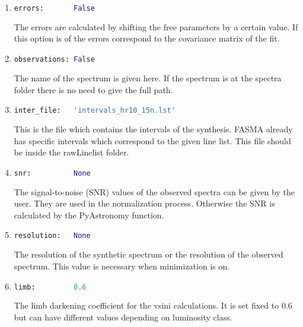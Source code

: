 \documentclass[a4paper,10pt]{article}
\begin{document}
\begin{enumerate}
\item
\begin{lstlisting}[language=Python]
errors:       False
\end{lstlisting}
The errors are calculated by shifting the free parameters by a certain value. If this option is of the errors correspond to the covariance matrix of the fit.

\item
\begin{lstlisting}[language=Python]
observations: False
\end{lstlisting}
The name of the spectrum is given here. If the spectrum is at the spectra folder there is no need to give the full path.

\item
\begin{lstlisting}[language=Python]
inter_file:   'intervals_hr10_15n.lst'
\end{lstlisting}
This is the file which contains the intervals of the synthesis. FASMA already has specific intervals which correspond to the given line list. This file should be inside the rawLinelist folder.

\item
\begin{lstlisting}[language=Python]
snr:          None
\end{lstlisting}
The signal-to-noise (SNR) values of the observed spectra can be given by the user. They are used in the normalization process. Otherwise the SNR is calculated by the PyAstronomy function.

\item
\begin{lstlisting}[language=Python]
resolution:   None
\end{lstlisting}
The resolution of the synthetic spectrum or the resolution of the observed spectrum. This value is necessary when minimization is on.

\item
\begin{lstlisting}[language=Python]
limb:         0.6
\end{lstlisting}
The limb darkening coefficient for the vsini calculations. It is set fixed to 0.6 but can have different values depending on luminosity class.
\end{enumerate}
\end{document}
